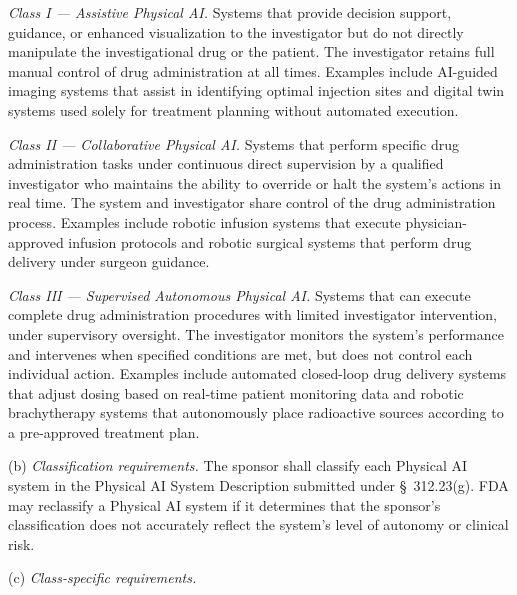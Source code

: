 \documentclass[11pt]{article}
\begin{document}
\begin{description}[leftmargin=0.8cm,style=sameline]
\item[(1)] \textit{Class I --- Assistive Physical AI.} Systems that provide decision support, guidance, or enhanced visualization to the investigator but do not directly manipulate the investigational drug or the patient. The investigator retains full manual control of drug administration at all times. Examples include AI-guided imaging systems that assist in identifying optimal injection sites and digital twin systems used solely for treatment planning without automated execution.
\item[(2)] \textit{Class II --- Collaborative Physical AI.} Systems that perform specific drug administration tasks under continuous direct supervision by a qualified investigator who maintains the ability to override or halt the system's actions in real time. The system and investigator share control of the drug administration process. Examples include robotic infusion systems that execute physician-approved infusion protocols and robotic surgical systems that perform drug delivery under surgeon guidance.
\item[(3)] \textit{Class III --- Supervised Autonomous Physical AI.} Systems that can execute complete drug administration procedures with limited investigator intervention, under supervisory oversight. The investigator monitors the system's performance and intervenes when specified conditions are met, but does not control each individual action. Examples include automated closed-loop drug delivery systems that adjust dosing based on real-time patient monitoring data and robotic brachytherapy systems that autonomously place radioactive sources according to a pre-approved treatment plan.
\end{description}

(b) \textit{Classification requirements.} The sponsor shall classify each Physical AI system in the Physical AI System Description submitted under \S~312.23(g). FDA may reclassify a Physical AI system if it determines that the sponsor's classification does not accurately reflect the system's level of autonomy or clinical risk.

(c) \textit{Class-specific requirements.}
\end{document}
